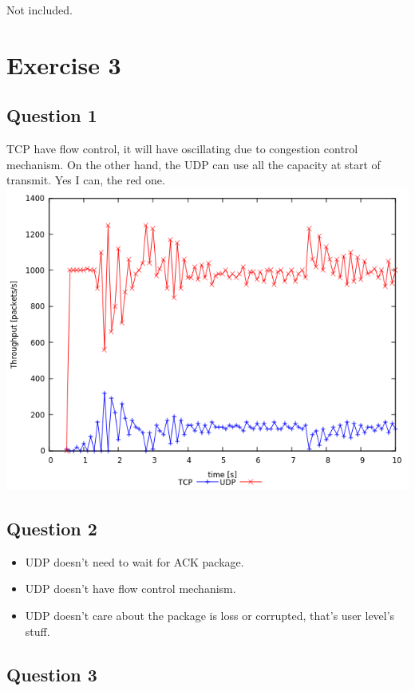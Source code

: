 \documentclass{article}
\begin{document}
Not included.

\section{Exercise 3}

\subsection{Question 1}

TCP have flow control, it will have oscillating due to congestion control mechanism. On the other hand, the UDP can use all the capacity at start of  transmit. Yes I can, the red one.\\
\includegraphics[width=\textwidth]{ex3q1.png}

\subsection{Question 2}
\begin{itemize}
\item UDP doesn't need to wait for ACK package.
\item UDP doesn't have flow control mechanism.
\item UDP doesn't care about the package is loss or corrupted, that's user level's stuff. 
\end{itemize}

\subsection{Question 3}
\end{document}
